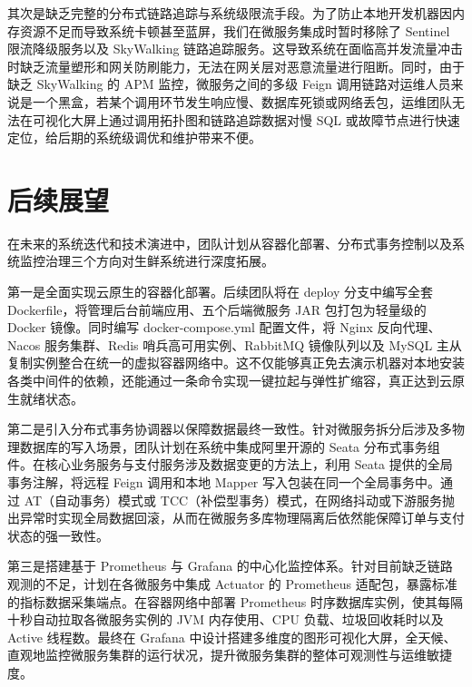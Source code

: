 其次是缺乏完整的分布式链路追踪与系统级限流手段。为了防止本地开发机器因内存资源不足而导致系统卡顿甚至蓝屏，我们在微服务集成时暂时移除了 Sentinel 限流降级服务以及 SkyWalking 链路追踪服务。这导致系统在面临高并发流量冲击时缺乏流量塑形和网关防刷能力，无法在网关层对恶意流量进行阻断。同时，由于缺乏 SkyWalking 的 APM 监控，微服务之间的多级 Feign 调用链路对运维人员来说是一个黑盒，若某个调用环节发生响应慢、数据库死锁或网络丢包，运维团队无法在可视化大屏上通过调用拓扑图和链路追踪数据对慢 SQL 或故障节点进行快速定位，给后期的系统级调优和维护带来不便。

\section{后续展望}

在未来的系统迭代和技术演进中，团队计划从容器化部署、分布式事务控制以及系统监控治理三个方向对生鲜系统进行深度拓展。

第一是全面实现云原生的容器化部署。后续团队将在 deploy 分支中编写全套 Dockerfile，将管理后台前端应用、五个后端微服务 JAR 包打包为轻量级的 Docker 镜像。同时编写 docker-compose.yml 配置文件，将 Nginx 反向代理、Nacos 服务集群、Redis 哨兵高可用实例、RabbitMQ 镜像队列以及 MySQL 主从复制实例整合在统一的虚拟容器网络中。这不仅能够真正免去演示机器对本地安装各类中间件的依赖，还能通过一条命令实现一键拉起与弹性扩缩容，真正达到云原生就绪状态。

第二是引入分布式事务协调器以保障数据最终一致性。针对微服务拆分后涉及多物理数据库的写入场景，团队计划在系统中集成阿里开源的 Seata 分布式事务组件。在核心业务服务与支付服务涉及数据变更的方法上，利用 Seata 提供的全局事务注解，将远程 Feign 调用和本地 Mapper 写入包装在同一个全局事务中。通过 AT（自动事务）模式或 TCC（补偿型事务）模式，在网络抖动或下游服务抛出异常时实现全局数据回滚，从而在微服务多库物理隔离后依然能保障订单与支付状态的强一致性。

第三是搭建基于 Prometheus 与 Grafana 的中心化监控体系。针对目前缺乏链路观测的不足，计划在各微服务中集成 Actuator 的 Prometheus 适配包，暴露标准的指标数据采集端点。在容器网络中部署 Prometheus 时序数据库实例，使其每隔十秒自动拉取各微服务实例的 JVM 内存使用、CPU 负载、垃圾回收耗时以及 Active 线程数。最终在 Grafana 中设计搭建多维度的图形可视化大屏，全天候、直观地监控微服务集群的运行状况，提升微服务集群的整体可观测性与运维敏捷度。
